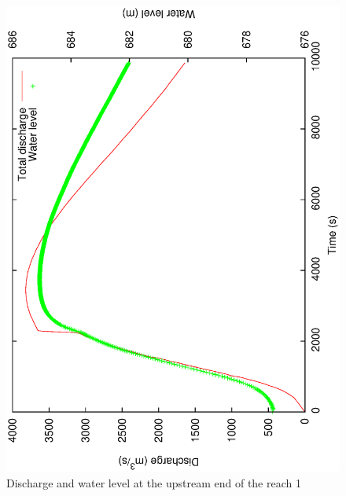 \documentclass[a4paper,12pt]{article}
\begin{document}
\begin{figure}[!t]
  \begin{center}
  \includegraphics[scale=0.42,angle=-90]{flow-disch-r1}
  \caption{Discharge and water level at the upstream end of the reach 1}
  \label{fig:Discharge-and-Water}
  \end{center}
\end{figure}
\end{document}
